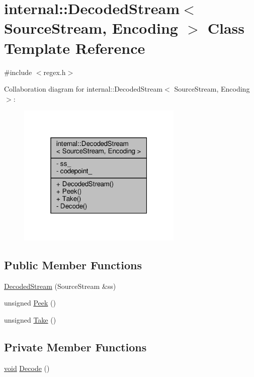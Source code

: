 \hypertarget{classinternal_1_1DecodedStream}{}\section{internal\+:\+:Decoded\+Stream$<$ Source\+Stream, Encoding $>$ Class Template Reference}
\label{classinternal_1_1DecodedStream}


{\ttfamily \#include $<$regex.\+h$>$}



Collaboration diagram for internal\+:\+:Decoded\+Stream$<$ Source\+Stream, Encoding $>$\+:
\nopagebreak
\begin{figure}[H]
\begin{center}
\leavevmode
\includegraphics[width=223pt]{classinternal_1_1DecodedStream__coll__graph}
\end{center}
\end{figure}
\subsection*{Public Member Functions}
\begin{DoxyCompactItemize}
\item 
\hyperlink{classinternal_1_1DecodedStream_a45cf40c4e515be8aaa8cd020eaa67595}{Decoded\+Stream} (Source\+Stream \&ss)
\item 
unsigned \hyperlink{classinternal_1_1DecodedStream_ac78f2cbc03ae0d79a0fcfe6d56589d70}{Peek} ()
\item 
unsigned \hyperlink{classinternal_1_1DecodedStream_a62b45969ce169bef1da0600490329857}{Take} ()
\end{DoxyCompactItemize}
\subsection*{Private Member Functions}
\begin{DoxyCompactItemize}
\item 
\hyperlink{imgui__impl__opengl3__loader_8h_ac668e7cffd9e2e9cfee428b9b2f34fa7}{void} \hyperlink{classinternal_1_1DecodedStream_aec6be1692e1f283c1dde407cce1bb873}{Decode} ()
\end{DoxyCompactItemize}
